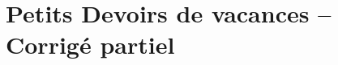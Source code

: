 \documentclass[
	fontsize=10pt, %
	twoside=true, %
]{kaobook}
\newcommand{\repRel}{../../../..}
\newcommand{\repStyle}{\repRel/Style}
\begin{document}
%
%
%

%
\mainmatter %


\setcounter{margintocdepth}{\sectiontocdepth}
\marginlayout
\graphicspath{{\repStyle/png}}

\pagestyle{xp.scrheadings}


\newcommand{\repExo}{}
\newcommand{\nomExo}{}


\livretfalse %
\proftrue
\collefalse
\normaltrue
\setcounter{cptApplication}{1}
\setcounter{cptTD}{1}
\newcommand{\exer}{\subsection*}
\newcommand{\td}{}


\setcounter{decsec}{0} %


\renewcommand{\exer}[1]{
    \stepcounter{decsec}
    \subsection*{Exercice \arabic{decsec} -- #1}
}

\chapter*{Petits Devoirs de vacances -- Corrigé partiel}



%
\end{document}
